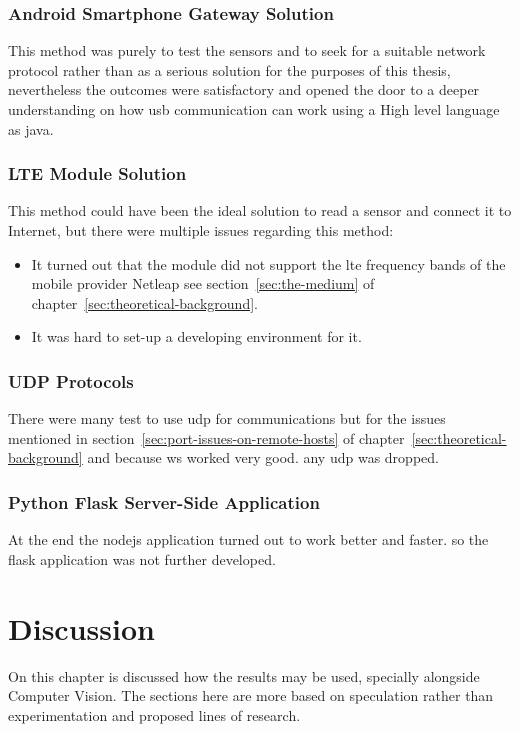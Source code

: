 \documentclass[hidelinks,11pt,a4paper,oneside,article]{memoir}
\begin{document}
\subsection{Android Smartphone Gateway Solution}
This method was purely to test the sensors and to seek for a suitable network protocol rather than as a serious solution for the purposes of this thesis, nevertheless the outcomes were satisfactory and opened the door to a deeper understanding on how \gls{usb} communication can work using a High level language as \gls{java}.

\subsection{LTE Module Solution}
This method could have been the ideal solution to read a sensor and connect it to Internet, but there were multiple issues regarding this method:
\begin{itemize}
    \item It turned out that the module did not support the \gls{lte} frequency bands of the mobile provider Netleap see section~\ref{sec:the-medium} of chapter~\ref{sec:theoretical-background}.
    \item It was hard to set-up a developing environment for it.
\end{itemize} 

\subsection{UDP Protocols}
There were many test to use \gls{udp} for communications but for the issues mentioned in section~\ref{sec:port-issues-on-remote-hosts} of chapter~\ref{sec:theoretical-background} and because \gls{ws} worked very good. any \gls{udp} was dropped.

\subsection{Python Flask Server-Side Application}
At the end the \gls{nodejs} application turned out to work better and faster. so the flask application was not further developed.


\clearpage\chapter{Discussion}\label{sec:discussion}
On this chapter is discussed how the results may be used, specially alongside Computer Vision. The sections here are more based on speculation rather than experimentation and proposed lines of research.
\end{document}

